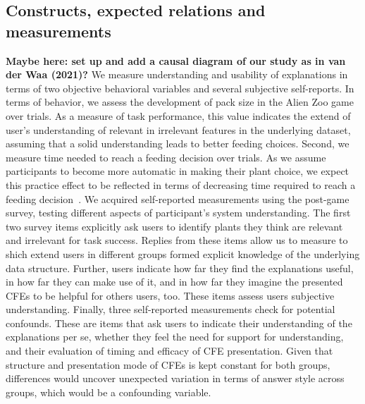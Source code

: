 \subsection{Constructs, expected relations and measurements}

\textcolor{ACMDarkBlue}{
\textbf{Maybe here: set up and add a causal diagram of our study as in van der Waa (2021)?}
} \textcolor{ACMDarkBlue}{
We measure understanding and usability of explanations in terms of two objective behavioral variables and several subjective self-reports. 
} \textcolor{ACMDarkBlue}{
In terms of behavior, we assess the development of pack size in the Alien Zoo game over trials. 
As a measure of task performance, this value indicates the extend of user's understanding of relevant in irrelevant features in the underlying dataset, assuming that a solid understanding leads to better feeding choices. 
} \textcolor{ACMDarkBlue}{
Second, we measure time needed to reach a feeding decision over trials. As we assume participants to become more automatic in making their plant choice, we expect this practice effect to be reflected in terms of decreasing time required to reach a feeding decision~\citep{logan_shapes_1992}. 
} \textcolor{ACMDarkBlue}{
We acquired self-reported measurements using the post-game survey, testing different aspects of participant’s system understanding. 
} \textcolor{ACMDarkBlue}{
The first two survey items explicitly ask users to identify plants they think are relevant and irrelevant for task success. 
Replies from these items allow us to measure to shich extend users in different groups formed explicit knowledge of the underlying data structure. 
} \textcolor{ACMDarkBlue}{
Further, users indicate how far they find the explanations useful, in how far they can make use of it, and in how far they imagine the presented \glspl{CFE} to be helpful for others users, too. These items assess users subjective understanding.
} \textcolor{ACMDarkBlue}{
Finally, three self-reported measurements check for potential confounds. 
These are items that ask users to indicate their understanding of the explanations per se, whether they feel the need for support for understanding, and their evaluation of timing and efficacy of \gls{CFE} presentation.
Given that structure and presentation mode of \glspl{CFE} is kept constant for both groups, differences would uncover unexpected variation in terms of answer style across groups, which would be a confounding variable. 
}

